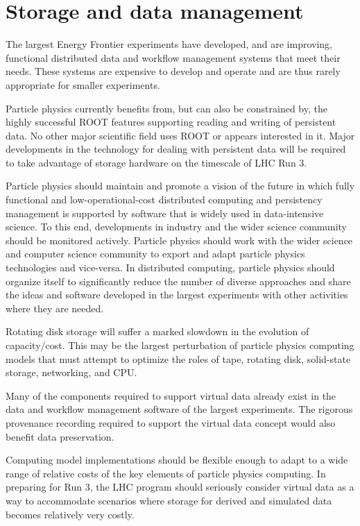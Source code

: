 \section{Storage and data management}


The largest Energy Frontier experiments have developed, and are improving,
functional distributed data and workflow management systems that meet
their needs. These systems are expensive to develop and operate and
are thus  rarely appropriate for smaller experiments.

Particle physics currently benefits from, but can also be  constrained by, the
highly successful ROOT features supporting reading  and writing of
persistent data. No other major scientific field uses  ROOT or appears
interested in it. Major developments in the technology for
dealing with persistent data will
be required to take advantage of storage hardware on the  timescale of
LHC Run 3.

Particle physics should maintain and promote a vision of the future  in which fully
functional and low-operational-cost distributed computing and
persistency management is supported by software that is widely used in
data-intensive science.  To this end, developments in industry and the
wider  science community should be monitored actively. Particle physics should work
with the wider  science and computer science community to export and
adapt particle physics technologies and  vice-versa. In distributed computing, particle physics
should organize itself to significantly  reduce the number of diverse
approaches and share the ideas and  software developed
in the largest experiments with other activities where they are needed.

Rotating disk storage will suffer a marked slowdown in the  evolution
of capacity/cost.  This may be the largest perturbation of particle physics
computing  models that must attempt to optimize the roles of tape,
rotating disk, solid-state  storage, networking, and CPU.

Many of the components required to support virtual data  already exist
in the data and workflow management software of the largest
experiments.   The rigorous provenance recording required to support
the virtual data concept would  also benefit data preservation.

Computing model implementations should be flexible  enough to adapt to
a wide range of relative costs of the key elements of particle physics  computing.
In preparing for Run 3, the LHC program should seriously consider
virtual data as a way to accommodate scenarios where storage for
derived and  simulated data becomes relatively very costly.

